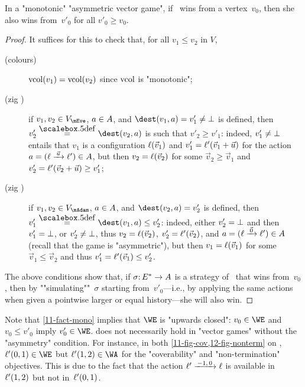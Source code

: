 \begin{lemma}[Simulation]\label{11-fact-mono}
  In a "monotonic" "asymmetric vector game", if \Eve\ wins from a
  vertex~$v_0$, then she also wins from~$v'_0$ for all $v'_0\geq
  v_0$.
\end{lemma}
\begin{proof}
  It suffices for this to check that, for all $v_1\leq v_2$ in $V$,
  \begin{description}
  \item[(colours)] $\mathrm{vcol}(v_1)=\mathrm{vcol}(v_2)$ since $\mathrm{vcol}$ is "monotonic";
  \item[(zig \Eve)] if $v_1,v_2\in V_\mEve$, $a\in A$, and
    $\dest(v_1,a)=v'_1\neq\sink$ is defined, then
    $v'_2\eqdef\dest(v_2,a)$ is such that $v'_2\geq v'_1$: indeed,
    $v'_1\neq\bot$ entails that $v_1$ is a configuration
    $\ell(\vec v_1)$ and $v'_1=\ell'(\vec v_1+\vec u)$ for the action
    $a=(\loc\step{\vec u}\loc')\in\Act$, but then $v_2=\ell(\vec v_2)$
    for some $\vec v_2\geq\vec v_1$ and
    $v'_2=\ell'(\vec v_2+\vec u)\geq v'_1$;
  \item[(zig \Adam)] if $v_1,v_2\in V_\mAdam$, $a\in A$, and
    $\dest(v_2,a)=v'_2$ is defined, then
    $v'_1\eqdef\dest(v_1,a)\leq v'_2$: indeed, either $v'_2=\bot$ and
    then $v'_1=\bot$, or $v'_2\neq\bot$, thus
    $v_2=\ell(\vec v_2)$, $v'_2=\ell'(\vec v_2)$, and
    $a=(\loc\step{\vec 0}\loc')\in\Act$ (recall that the game is
    "asymmetric"), but then $v_1=\ell(\vec v_1)$ for some
    $\vec v_1\leq\vec v_2$ and thus $v'_1=\ell'(\vec v_1)\leq v'_2$.
  \end{description}
  The above conditions show that, if $\sigma{:}\,E^\ast\to A$ is a
  strategy of \Eve\ that wins from~$v_0$, then by
  ""simulating""~$\sigma$ starting from~$v'_0$---i.e., by applying the
  same actions when given a pointwise larger or equal history---she
  will also win.
\end{proof}

Note that \cref{11-fact-mono} implies that $\WE$ is "upwards closed":
$v_0\in\WE$ and $v_0\leq v'_0$ imply $v_0'\in\WE$.  
does not necessarily hold in "vector games" without the "asymmetry"
condition.  For instance, in both \cref{11-fig-cov,12-fig-nonterm} on
, $\loc'(0,1)\in\WE$ but $\loc'(1,2)\in\WA$ for
the "coverability" and "non-termination" objectives.  This is due to
the fact that the action $\loc'\step{-1,0}\loc$ is available
in~$\ell'(1,2)$ but not in~$\ell'(0,1)$.


